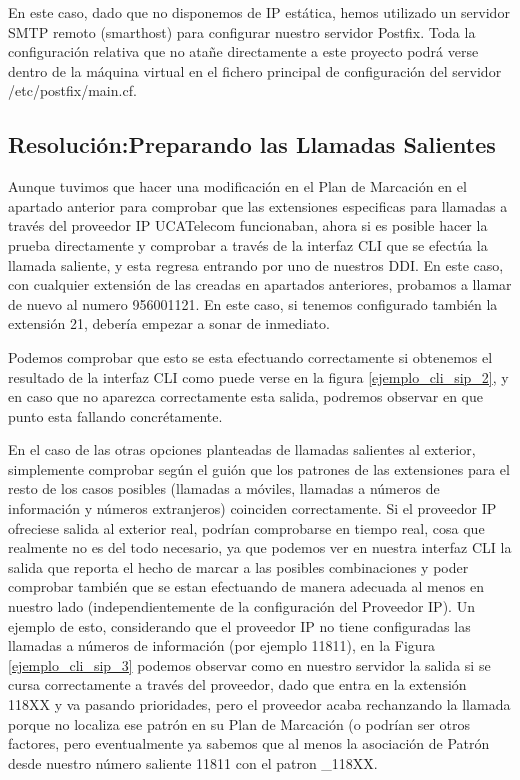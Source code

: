 En este caso, dado que no disponemos de IP estática, hemos utilizado un servidor SMTP remoto (smarthost) para configurar nuestro servidor Postfix. Toda la configuración relativa que no atañe directamente a este proyecto podrá verse dentro de la máquina virtual en el fichero principal de configuración del servidor /etc/postfix/main.cf. \cite{website:relaysmtp}

\subsection{Resolución:Preparando las Llamadas Salientes}

Aunque tuvimos que hacer una modificación en el Plan de Marcación en el apartado anterior para comprobar que las extensiones especificas para llamadas a través del proveedor IP UCATelecom funcionaban, ahora si es posible hacer la prueba directamente y comprobar a través de la interfaz CLI que se efectúa la llamada saliente, y esta regresa entrando por uno de nuestros DDI. En este caso, con cualquier extensión de las creadas en apartados anteriores, probamos a llamar de nuevo al numero 956001121. En este caso, si tenemos configurado también la extensión 21, debería empezar a sonar de inmediato.

Podemos comprobar que esto se esta efectuando correctamente si obtenemos el resultado de la interfaz CLI como puede verse en la figura \ref{ejemplo_cli_sip_2}, y en caso que no aparezca correctamente esta salida, podremos observar en que punto esta fallando concrétamente.


En el caso de las otras opciones planteadas de llamadas salientes al exterior, simplemente comprobar según el guión que los patrones de las extensiones para el resto de los casos posibles (llamadas a móviles, llamadas a números de información y números extranjeros) coinciden correctamente. Si el proveedor IP ofreciese salida al exterior real, podrían comprobarse en tiempo real, cosa que realmente no es del todo necesario, ya que podemos ver en nuestra interfaz CLI la salida que reporta el hecho de marcar a las posibles combinaciones y poder comprobar también que se estan efectuando de manera adecuada al menos en nuestro lado (independientemente de la configuración del Proveedor IP). Un ejemplo de esto, considerando que el proveedor IP no tiene configuradas las llamadas a números de información (por ejemplo 11811), en la Figura \ref{ejemplo_cli_sip_3} podemos observar como en nuestro servidor la salida si se cursa correctamente a través del proveedor, dado que entra en la extensión 118XX y va pasando prioridades, pero el proveedor acaba rechanzando la llamada porque no localiza ese patrón en su Plan de Marcación (o podrían ser otros factores, pero eventualmente ya sabemos que al menos la asociación de Patrón desde nuestro número saliente 11811 con el patron \_118XX.

